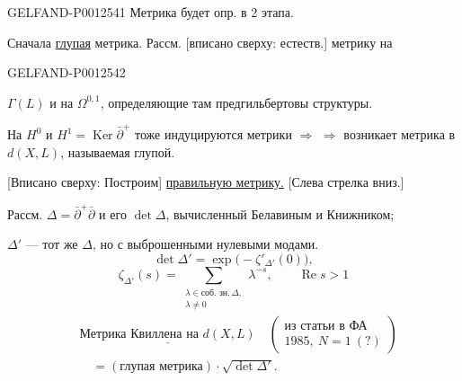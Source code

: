 \begin{GelfandAdjacentEvidence}{GELFAND-P001254}{1}
Метрика будет опр. в 2 этапа.

Сначала \underline{глупая} метрика. Рассм. [вписано сверху: естеств.] метрику на
\end{GelfandAdjacentEvidence}
\begin{GelfandAdjacentEvidence}{GELFAND-P001254}{2}

$\Gamma(L)$ и на $\Omega^{0,1}$,
определяющие там предгильбертовы структуры.

На $H^0$ и $H^1=\operatorname{Ker}\bar\partial^{+}$ тоже индуцируются метрики
$\Rightarrow$\newline
$\Rightarrow$ возникает метрика в $d(X,L)$, называемая глупой.

[Вписано сверху: Построим] \underline{правильную метрику.}
[Слева стрелка вниз.]

Рассм. $\Delta=\bar\partial^{+}\bar\partial$ и его $\det\Delta$, вычисленный Белавиным и Книжником;

$\Delta'$ — тот же $\Delta$, но с выброшенными нулевыми модами.
\begin{equation*}
\det\Delta'=\exp\bigl(-\zeta'_{\Delta'}(0)\bigr),
\end{equation*}
\begin{equation*}
\zeta_{\Delta'}(s)=
\sum_{\substack{\lambda\in\text{соб. зн.}\,\Delta,\\\lambda\ne0}}
\lambda^{-s},\qquad\operatorname{Re}s>1
\end{equation*}
\begin{equation*}
\begin{aligned}
&\underline{\text{Метрика Квиллена на }d(X,L)}
\quad\left(\substack{\text{из статьи в ФА}\\1985,\ N=1\ (?) }\right)\\
&\hspace{1em}=(\text{глупая метрика})\cdot\sqrt{\det\Delta'}.
\end{aligned}\tag{7}
\end{equation*}
\end{GelfandAdjacentEvidence}
